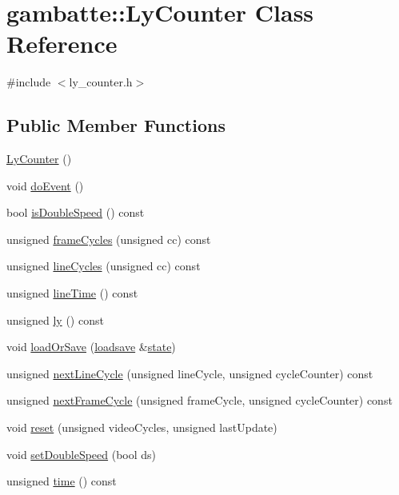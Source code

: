 \hypertarget{classgambatte_1_1LyCounter}{}\section{gambatte\+:\+:Ly\+Counter Class Reference}
\label{classgambatte_1_1LyCounter}


{\ttfamily \#include $<$ly\+\_\+counter.\+h$>$}

\subsection*{Public Member Functions}
\begin{DoxyCompactItemize}
\item 
\hyperlink{classgambatte_1_1LyCounter_ae00d817e2c66b471be768ed35ee3e4bf}{Ly\+Counter} ()
\item 
void \hyperlink{classgambatte_1_1LyCounter_a2a1aad7968d8da16c73986d6d9ddc52a}{do\+Event} ()
\item 
bool \hyperlink{classgambatte_1_1LyCounter_a1fa5ece09d091ac5914d797c3c3af45d}{is\+Double\+Speed} () const
\item 
unsigned \hyperlink{classgambatte_1_1LyCounter_a8065a4d22954b044cff67e9348d226c0}{frame\+Cycles} (unsigned cc) const
\item 
unsigned \hyperlink{classgambatte_1_1LyCounter_a053857da09189c2369a6883c8b2baa4e}{line\+Cycles} (unsigned cc) const
\item 
unsigned \hyperlink{classgambatte_1_1LyCounter_a14f9a683d417e789c53ebf835293ad8d}{line\+Time} () const
\item 
unsigned \hyperlink{classgambatte_1_1LyCounter_abe63480cb69ba5ced67b474884dda7d4}{ly} () const
\item 
void \hyperlink{classgambatte_1_1LyCounter_addf61a185ea59e84f66cc13c8e1f4a94}{load\+Or\+Save} (\hyperlink{classgambatte_1_1loadsave}{loadsave} \&\hyperlink{ppu_8cpp_a2f2eca6997ee7baf8901725ae074d45b}{state})
\item 
unsigned \hyperlink{classgambatte_1_1LyCounter_a645947821ce5a4ea6c717e71538cb06b}{next\+Line\+Cycle} (unsigned line\+Cycle, unsigned cycle\+Counter) const
\item 
unsigned \hyperlink{classgambatte_1_1LyCounter_ad4792cfaee1272e0f38ac3fa706f40eb}{next\+Frame\+Cycle} (unsigned frame\+Cycle, unsigned cycle\+Counter) const
\item 
void \hyperlink{classgambatte_1_1LyCounter_a9b7cef000b6dd0b36c8379b94c3bf87d}{reset} (unsigned video\+Cycles, unsigned last\+Update)
\item 
void \hyperlink{classgambatte_1_1LyCounter_a1bb68dd4a3ddd4dce3f29a88020d63f0}{set\+Double\+Speed} (bool ds)
\item 
unsigned \hyperlink{classgambatte_1_1LyCounter_adc6c7b713afb29e29a8ee8f9fea325c0}{time} () const
\end{DoxyCompactItemize}
